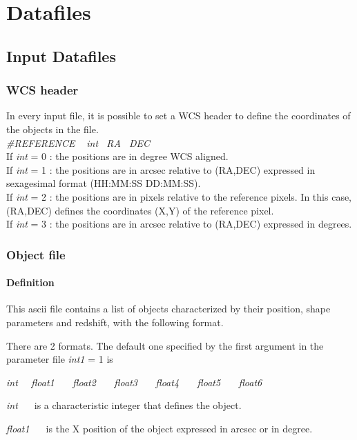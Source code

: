 
\chapter{Datafiles}

\section{Input Datafiles}

\subsection{WCS header}
In every input file, it is possible to set a WCS header to define the coordinates of the objects in the file. \\
{\sl \#REFERENCE \ } {\sl int \ RA \ DEC} \\
If \textit{int} = 0 : the positions are in degree WCS aligned.\\
If \textit{int} = 1 : the positions are in arcsec relative to (RA,DEC) expressed in sexagesimal format (HH:MM:SS DD:MM:SS). \\
If \textit{int} = 2 : the positions are in pixels relative to the reference pixels. In this case, (RA,DEC) defines the coordinates (X,Y) of the reference pixel. \\
If \textit{int} = 3 : the positions are in arcsec relative to (RA,DEC) expressed in degrees. \\

\subsection{Object file}

\subsubsection{Definition}

This ascii file contains a list of objects characterized by their position,
shape parameters and redshift, with the following format.


There are 2 formats. The default one specified by the first argument
in the parameter file {\sl int1} = 1 is  

{\sl int \ \  float1 \ \ \ float2 \ \ \ float3 \ \ \ float4
\ \ \ float5 \ \ \ float6}

{\sl int \ \ } is a characteristic integer that defines the object.

{\sl float1 \ \ } is the X position of the object expressed in arcsec or in degree.

